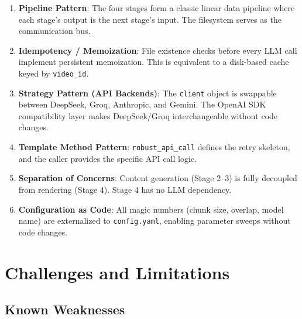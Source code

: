 \documentclass[11pt,a4paper]{article}
\begin{document}
\begin{enumerate}[leftmargin=1.5em]
    \item \textbf{Pipeline Pattern}: The four stages form a classic linear data pipeline where each stage's output is the next stage's input. The filesystem serves as the communication bus.

    \item \textbf{Idempotency / Memoization}: File existence checks before every LLM call implement persistent memoization. This is equivalent to a disk-based cache keyed by \texttt{video\_id}.

    \item \textbf{Strategy Pattern (API Backends)}: The \texttt{client} object is swappable between DeepSeek, Groq, Anthropic, and Gemini. The OpenAI SDK compatibility layer makes DeepSeek/Groq interchangeable without code changes.

    \item \textbf{Template Method Pattern}: \texttt{robust\_api\_call} defines the retry skeleton, and the caller provides the specific API call logic.

    \item \textbf{Separation of Concerns}: Content generation (Stage 2--3) is fully decoupled from rendering (Stage 4). Stage 4 has no LLM dependency.

    \item \textbf{Configuration as Code}: All magic numbers (chunk size, overlap, model name) are externalized to \texttt{config.yaml}, enabling parameter sweeps without code changes.
\end{enumerate}

\section{Challenges and Limitations}

\subsection{Known Weaknesses}
\end{document}
